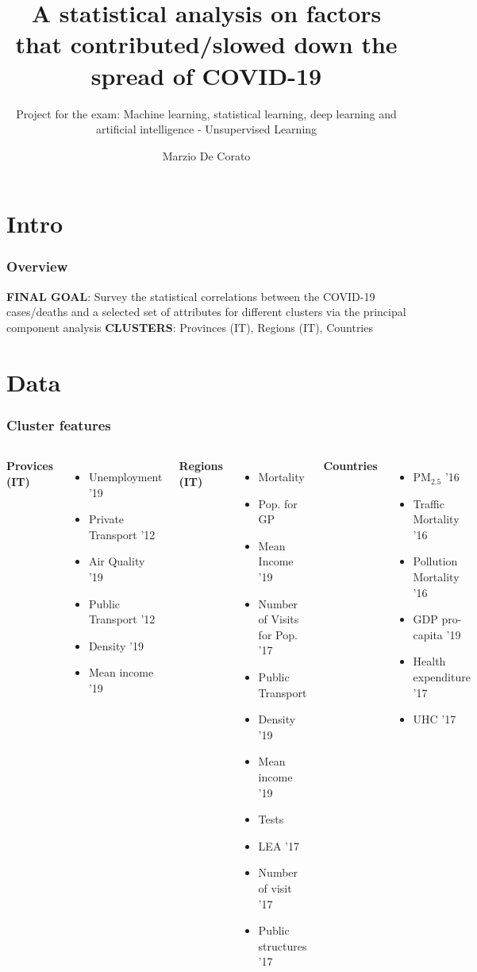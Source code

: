\documentclass[compress]{beamer}
\title[COVID-19 - Unsupervised Learning]{A statistical analysis on factors that contributed/slowed down the spread of COVID-19}
\author{Marzio De Corato}
\subtitle{Project for the exam: Machine learning, statistical
learning, deep learning and artificial intelligence - Unsupervised Learning}
\begin{document}
\frame{\titlepage}

\section{Intro}

\begin{frame}
\frametitle{Overview}
\textbf{FINAL GOAL}: Survey the statistical correlations between the COVID-19 cases/deaths and a selected set of attributes for different clusters via the principal component analysis 
\newline
\newline
\textbf{CLUSTERS}: Provinces (IT), Regions (IT), Countries

\end{frame}

\section{Data}

\begin{frame}
\frametitle{Cluster features}
\begin{columns}
\textbf{Provices (IT)}
\begin{itemize}
\item Unemployment '19
\item Private Transport '12 
\item Air Quality '19
\item Public Transport '12
\item Density '19
\item Mean income '19
\end{itemize}
\textbf{Regions (IT)}
\begin{itemize}
\item Mortality
\item Pop. for GP
\item Mean Income '19
\item Number of Visits for Pop. '17
\item Public Transport 
\item Density '19
\item Mean income '19
\item Tests 
\item LEA '17
\item Number of visit '17
\item Public structures '17
\end{itemize}
\textbf{Countries}
\begin{itemize}
\item PM$_{2.5}$ '16
\item Traffic Mortality '16
\item Pollution Mortality '16
\item GDP pro-capita '19
\item Health expenditure '17
\item UHC '17
\end{itemize}
\end{columns}
\end{frame}
\end{document}

